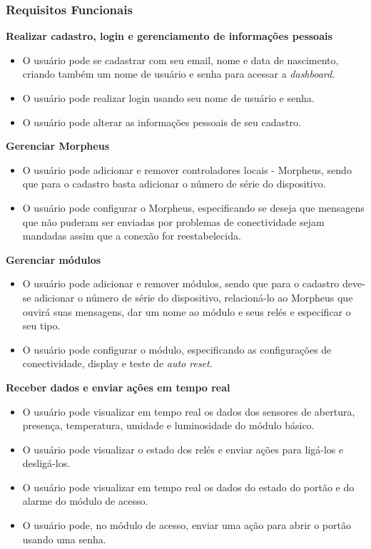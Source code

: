 \subsubsection{Requisitos Funcionais}
\begin{description}

\item \textbf{Realizar cadastro, login e gerenciamento de informações pessoais}

\begin{itemize}
\item O usuário pode se cadastrar com seu email, nome e data de nascimento, criando também um nome de usuário e senha para acessar a \textit{dashboard}.
\item O usuário pode realizar login usando seu nome de usuário e senha.
\item O usuário pode alterar as informações pessoais de seu cadastro.
\end{itemize}

\item \textbf{Gerenciar Morpheus}

\begin{itemize}
\item O usuário pode adicionar e remover controladores locais - Morpheus, sendo que para o cadastro basta adicionar o número de série do dispositivo.
\item O usuário pode configurar o Morpheus, especificando se deseja que mensagens que não puderam ser enviadas por problemas de conectividade sejam mandadas assim que a conexão for reestabelecida.
\end{itemize}

\item \textbf{Gerenciar módulos}

\begin{itemize}
\item O usuário pode adicionar e remover módulos, sendo que para o cadastro deve-se adicionar o número de série do dispositivo, relacioná-lo ao Morpheus que ouvirá suas mensagens, dar um nome ao módulo e seus relés e especificar o seu tipo.
\item O usuário pode configurar o módulo, especificando as configurações de conectividade, display e teste de \emph{auto reset}.
\end{itemize}

\item \textbf{Receber dados e enviar ações em tempo real}

\begin{itemize}
\item O usuário pode visualizar em tempo real os dados dos sensores de abertura, presença, temperatura, umidade e luminosidade do módulo básico.
\item O usuário pode visualizar o estado dos relés e enviar ações para ligá-los e desligá-los.
\item O usuário pode visualizar em tempo real os dados do estado do portão e do alarme do módulo de acesso.
\item O usuário pode, no módulo de acesso, enviar uma ação para abrir o portão usando uma senha.
\end{itemize}


\end{description}
